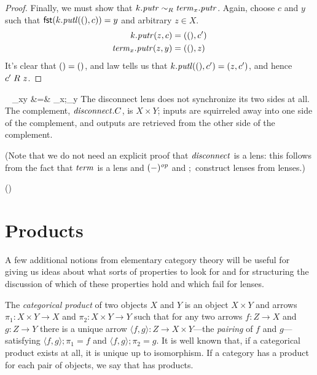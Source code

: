 \begin{defn}[$R$-similarity]
\begin{theorem}
\begin{lemma}
\begin{proof}
Finally, we must show that $k.\mathit{putr} \sim_R \mathit{term}_x.\mathit{putr}$. Again, choose
$c$ and $y$ such that $\mathsf{fst}(k.\mathit{putl}({()},c))=y$ and arbitrary $z \in X$.
\begin{align*}
    k.\mathit{putr}(z,c) &= ({()},c') \\
    \mathit{term}_x.\mathit{putr}(z,y) &= ({()},z)
\end{align*}
It's clear that ${()}={()}$, and law  tells us that
$k.\mathit{putl}({()},c') = (z,c')$, and hence $c' \mathrel{R_{}} z$.
\end{proof}
\fi

\iffull\ifdissertation\else\clearpage\fi\fi

\begin{defn}\ 
{}
{\disconnect_{xy} &=& \const_x;\const_y\op}
The disconnect lens does not synchronize its two sides at all. The
complement, $\mathit{disconnect}.C$, is $X \times Y$; inputs are squirreled away into
one side of the complement, and outputs are retrieved
from the other side of the complement.
\end{defn}

\iffull (Note that we do not need an explicit proof that $\mathit{disconnect}$ is a
lens: this follows from the fact that $\mathit{term}$ is a lens and $(-)^\mathit{op}$ and
$;$ construct lenses from lenses.)  \fi

\iflater
()
\fi

\section{Products}\label{prod}

A few additional notions from elementary category theory will be useful for
giving 
us ideas about what sorts of properties to look for and for 
structuring the discussion of which of these properties hold and which fail
for lenses.

The \emph{categorical product} of two objects $X$ and $Y$ is an object
$X\times Y$ and arrows $\pi_1:X\times Y\rightarrow X$
and $\pi_2:X\times Y\rightarrow Y$ such that for any two arrows $f :
Z\rightarrow X$ and $g:Z\rightarrow Y$ there is a unique arrow
$\langle f,g\rangle:Z\rightarrow X\times Y$---the {\em pairing} of $f$ and
$g$---satisfying $\langle f,g\rangle;\pi_1=f$ and $\langle
f,g\rangle;\pi_2=g$. It is well known that, if a categorical product
exists at all, it is unique up to isomorphism.
%
If a category \catC has a product for each pair of objects, we say that
\catC has products.


\end{lemma}
\end{theorem}
\end{defn}
